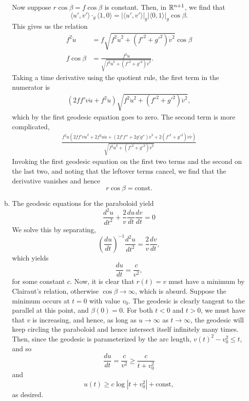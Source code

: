 \documentclass{../mathnotes}
\begin{document}
\begin{enumerate}[(a)]
        Now suppose $r\cos\beta=f\cos\beta$ is constant. Then, in $\mathbb{R}^{n+1}$, we find that
        \[\langle u',v'\rangle\cdot_g\langle 1,0\rangle = |\langle u',v'\rangle|_g|\langle 0,1\rangle|_g\cos\beta.\]
        This gives us the relation
        \begin{align*}
            f^2\dot u &= f\sqrt{f^2\dot u^2+(f'^2+g'^2)\dot v^2}\cos\beta\\
            f\cos\beta &= \frac{f^2\dot u}{\sqrt{f^2\dot u^2+(f'^2+g'^2)\dot v^2}}.
        \end{align*}
        Taking a time derivative using the quotient rule, the first term in the numerator is
        \begin{align*}
            (2ff'\dot v\dot u + f^2\ddot u)\sqrt{f^2\dot u^2+(f'^2+g'^2)\dot v^2},
        \end{align*}
        which by the first geodesic equation goes to zero. The second term is more complicated,
        \begin{align*}
            \frac{f^2\dot u\left(2ff'\dot v\dot u^2+2f^2\dot u\ddot u+(2f'f''+2g'g'')\dot v^3+2(f'^2+g'^2)\dot v\ddot v\right)}{\sqrt{f^2\dot u^2+(f'^2+g'^2)\dot v^2}}
        \end{align*}
        Invoking the first geodesic equation on the first two terms and the second on the last two,
        and noting that the leftover terms cancel, we find that the derivative vanishes and hence
        \[r\cos\beta=\text{const}.\]
    \item The geodesic equations for the paraboloid yield
        \[\frac{d^2u}{dt^2}+\frac{2}{v}\frac{du}{dt}\frac{dv}{dt}=0\]
        We solve this by separating,
        \[\left( \frac{du}{dt} \right)^{-1}\frac{d^2u}{dt^2}=\frac{2}{v}\frac{dv}{dt},\]
        which yields
        \[\frac{du}{dt}=\frac{c}{v^2},\]
        for some constant $c$. Now, it is clear that $r(t)=v$ must have a minimum by Clairaut's relation,
        otherwise $\cos\beta\to\infty$, which is absurd. Suppose the minimum occurs at $t=0$ with value $v_0$.
        The geodesic is clearly tangent to the parallel at this point, and $\beta(0)=0$. For
        both $t<0$ and $t>0$, we must have that $v$ is increasing, and hence, as long as
        $u\to\infty$ as $t\to\infty$, the geodesic will keep circling the paraboloid and hence intersect
        itself infinitely many times. Then, since the geodesic is parameterized by the arc length,
        $v(t)^2-v_0^2\leq t$, and so
        \[\frac{du}{dt}=\frac{c}{v^2}\geq\frac{c}{t+v_0^2}\]
        and \[u(t)\geq c\log|t+v_0^2|+\text{const},\]
        as desired.
\end{enumerate}
\end{document}
